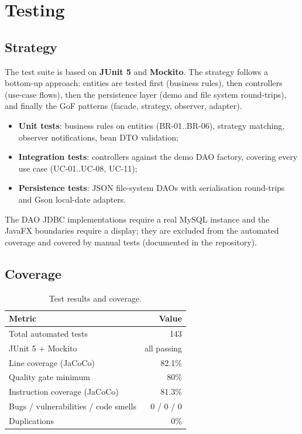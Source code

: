 \chapter{Testing}\label{ch:testing}

\section{Strategy}

The test suite is based on \textbf{JUnit 5} and \textbf{Mockito}. The strategy
follows a bottom-up approach: entities are tested first (business rules),
then controllers (use-case flows), then the persistence layer (demo and file
system round-trips), and finally the GoF patterns (facade, strategy, observer,
adapter).

\begin{itemize}
    \item \textbf{Unit tests}: business rules on entities (BR-01..BR-06),
    strategy matching, observer notifications, bean DTO validation;
    \item \textbf{Integration tests}: controllers against the demo DAO
    factory, covering every use case (UC-01..UC-08, UC-11);
    \item \textbf{Persistence tests}: JSON file-system DAOs with
    serialisation round-trips and Gson local-date adapters.
\end{itemize}

The DAO JDBC implementations require a real MySQL instance and the JavaFX
boundaries require a display; they are excluded from the automated coverage
and covered by manual tests (documented in the repository).

\section{Coverage}

\begin{table}[H]
\centering
\caption{Test results and coverage.}
\label{tab:testing}
\begin{tabular}{@{}lr@{}}
\toprule
\textbf{Metric} & \textbf{Value} \\
\midrule
Total automated tests & 143 \\
JUnit 5 + Mockito & all passing \\
Line coverage (JaCoCo) & 82.1\% \\
Quality gate minimum & 80\% \\
Instruction coverage (JaCoCo) & 81.3\% \\
Bugs / vulnerabilities / code smells & 0 / 0 / 0 \\
Duplications & 0\% \\
\bottomrule
\end{tabular}
\end{table}

